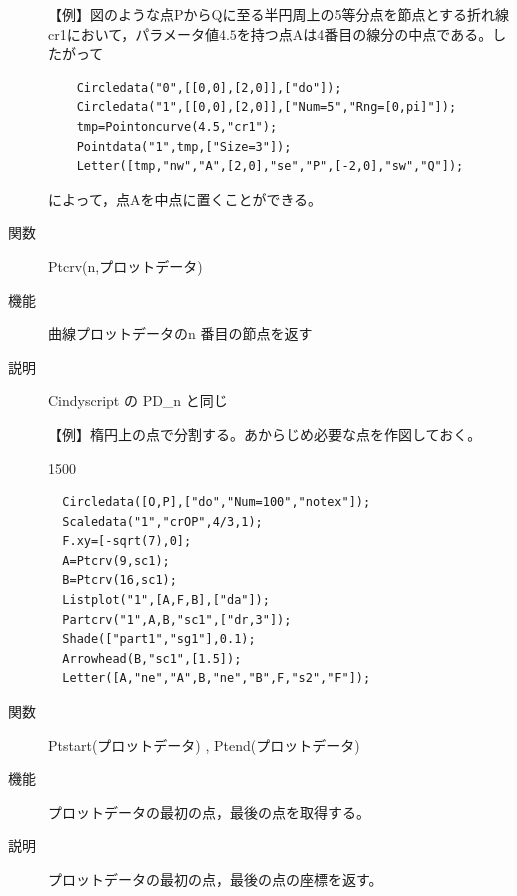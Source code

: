 \documentclass[papersize,a4paper,12pt,uplatex]{jsarticle}
\begin{document}
\begin{description}
\vspace{\baselineskip}
【例】図のような点$\mathrm{P}$から$\mathrm{Q}$に至る半円周上の5等分点を節点とする折れ線cr1において，パラメータ値$4.5$を持つ点$\mathrm{A}$は4番目の線分の中点である。したがって

\begin{verbatim}
    Circledata("0",[[0,0],[2,0]],["do"]);
    Circledata("1",[[0,0],[2,0]],["Num=5","Rng=[0,pi]"]);
    tmp=Pointoncurve(4.5,"cr1");
    Pointdata("1",tmp,["Size=3"]);
    Letter([tmp,"nw","A",[2,0],"se","P",[-2,0],"sw","Q"]);
\end{verbatim}
    
によって，点Aを中点に置くことができる。

\vspace{\baselineskip}
 \begin{center}  \end{center}


\vspace{\baselineskip}
\hypertarget{ptcrv}{}
\item[関数]  Ptcrv(n,プロットデータ)
\item[機能]  曲線プロットデータのn 番目の節点を返す
\item[説明]  Cindyscript の PD\_n と同じ

\vspace{\baselineskip}
【例】楕円上の点で分割する。あからじめ必要な点を作図しておく。

\begin{layer}{150}{0}
\end{layer}
\begin{verbatim}
  Circledata([O,P],["do","Num=100","notex"]);
  Scaledata("1","crOP",4/3,1);
  F.xy=[-sqrt(7),0];
  A=Ptcrv(9,sc1);
  B=Ptcrv(16,sc1);
  Listplot("1",[A,F,B],["da"]);
  Partcrv("1",A,B,"sc1",["dr,3"]);
  Shade(["part1","sg1"],0.1);
  Arrowhead(B,"sc1",[1.5]);
  Letter([A,"ne","A",B,"ne","B",F,"s2","F"]);
\end{verbatim}
   

\vspace{\baselineskip}
\hypertarget{ptstart}{}
\item[関数]  Ptstart(プロットデータ) , Ptend(プロットデータ)
\item[機能]  プロットデータの最初の点，最後の点を取得する。
\item[説明]  プロットデータの最初の点，最後の点の座標を返す。


\end{description}
\end{document}
